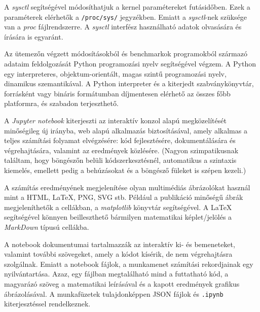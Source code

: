 A \textit{sysctl} segítségével módosíthatjuk a kernel paramétereket futásidőben. Ezek a paraméterek elérhetők a \texttt{/proc/sys/} jegyzékben. Emiatt a \textit{sysctl}-nek szüksége van a \textit{proc} fájlrendszerre. A \textit{sysctl} interfész használható adatok olvasására és írására is egyaránt.


Az ütemezőn végzett módosításokból és benchmarkok programokból származó adataim feldolgozását Python programozási nyelv segítségével végzem.
A Python egy interpreteres, objektum-orientált, magas szintű programozási nyelv, dinamikus szemantikával.
A Python interpreter és a kiterjedt szabványkönyvtár, forrásként vagy bináris formátumban díjmentesen elérhető az összes főbb platformra, és szabadon terjeszthető.


A \textit{Jupyter notebook} kiterjeszti az interaktív konzol alapú megközelítését minőségileg új irányba, web alapú alkalmazás biztosításával, amely alkalmas a teljes számítási folyamat elvégzésére: kód fejlesztésére, dokumentálására és végrehajtására, valamint az eredmények közlésére.
(Nagyon szimpatikusnak találtam, hogy böngészőn belüli kódszerkesztésnél, automatikus a szintaxis kiemelés, emellett pedig a behúzásokat és a böngésző füleket is szépen kezeli.)

A számítás eredményének megjelenítése olyan multimédiás ábrázolókat használ mint a HTML, LaTeX, PNG, SVG stb. Például a publikáció minőségű ábrák megjeleníthetők a cellákban, a \textit{matplotlib} könyvtár segítségével. A LaTeX segítségével könnyen beilleszthető bármilyen matematikai képlet/jelölés a \textit{MarkDown} típusú cellákba.

A notebook dokumentumai tartalmazzák az interaktív ki- és bemeneteket, valamint további szövegeket, amely a kódot kísérik, de nem végrehajtásra szolgálnak. 
Emiatt a notebook fájlok, a munkamenet számítási rekordjainak egy nyilvántartása. Azaz, egy fájlban megtalálható mind a futtatható kód, a magyarázó szöveg a matematikai leírásával és a kapott eredmények grafikus ábrázolásával. A munkafüzetek tulajdonképpen JSON fájlok és \texttt{.ipynb} kiterjesztéssel rendelkeznek.


